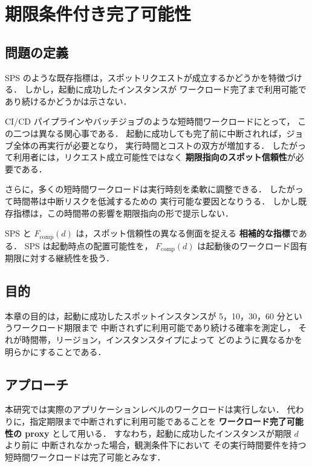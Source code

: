 \documentclass[11pt,a4paper]{ltjsreport}
\newcommand{\Fcomp}{F_{\mathrm{comp}}}
\begin{document}
\chapter{期限条件付き完了可能性}
\label{chap:fcomp}

\section{問題の定義}

SPS のような既存指標は，スポットリクエストが成立するかどうかを特徴づける．
しかし，起動に成功したインスタンスが
ワークロード完了まで利用可能であり続けるかどうかは示さない．

CI/CD パイプラインやバッチジョブのような短時間ワークロードにとって，
この二つは異なる関心事である．
起動に成功しても完了前に中断されれば，ジョブ全体の再実行が必要となり，
実行時間とコストの双方が増加する．
したがって利用者には，リクエスト成立可能性ではなく
\textbf{期限指向のスポット信頼性}が必要である．

さらに，多くの短時間ワークロードは実行時刻を柔軟に調整できる．
したがって時間帯は中断リスクを低減するための
実行可能な要因となりうる．
しかし既存指標は，この時間帯の影響を期限指向の形で提示しない．

SPS と $\Fcomp(d)$ は，スポット信頼性の異なる側面を捉える
\textbf{相補的な指標}である．
SPS は起動時点の配置可能性を，
$\Fcomp(d)$ は起動後のワークロード固有期限に対する継続性を扱う．

\section{目的}

本章の目的は，起動に成功したスポットインスタンスが
5，10，30，60 分というワークロード期限まで
中断されずに利用可能であり続ける確率を測定し，
それが時間帯，リージョン，インスタンスタイプによって
どのように異なるかを明らかにすることである．

\section{アプローチ}

本研究では実際のアプリケーションレベルのワークロードは実行しない．
代わりに，指定期限まで中断されずに利用可能であることを
\textbf{ワークロード完了可能性の proxy} として用いる．
すなわち，起動に成功したインスタンスが期限 $d$ より前に
中断されなかった場合，観測条件下において
その実行時間要件を持つ短時間ワークロードは完了可能とみなす．
\end{document}
